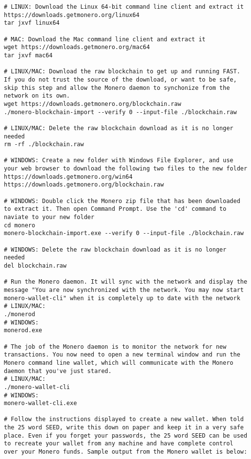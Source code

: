 \begin{lstlisting}
# LINUX: Download the Linux 64-bit command line client and extract it
https://downloads.getmonero.org/linux64
tar jxvf linux64

# MAC: Download the Mac command line client and extract it
wget https://downloads.getmonero.org/mac64
tar jxvf mac64

# LINUX/MAC: Download the raw blockchain to get up and running FAST. If you do not trust the source of the download, or want to be safe, skip this step and allow the Monero daemon to synchonize from the network on its own. 
wget https://downloads.getmonero.org/blockchain.raw
./monero-blockchain-import --verify 0 --input-file ./blockchain.raw

# LINUX/MAC: Delete the raw blockchain download as it is no longer needed 
rm -rf ./blockchain.raw

# WINDOWS: Create a new folder with Windows File Explorer, and use your web browser to download the following two files to the new folder
https://downloads.getmonero.org/win64
https://downloads.getmonero.org/blockchain.raw

# WINDOWS: Double click the Monero zip file that has been downloaded to extract it. Then open Command Prompt. Use the 'cd' command to naviate to your new folder
cd monero
monero-blockchain-import.exe --verify 0 --input-file ./blockchain.raw

# WINDOWS: Delete the raw blockchain download as it is no longer needed
del blockchain.raw

# Run the Monero daemon. It will sync with the network and display the message "You are now synchronized with the network. You may now start monero-wallet-cli" when it is completely up to date with the network
# LINUX/MAC:
./monerod
# WINDOWS:
monerod.exe

# The job of the Monero daemon is to monitor the network for new transactions. You now need to open a new terminal window and run the Monero command line wallet, which will communicate with the Monero daemon that you've just stared.
# LINUX/MAC:
./monero-wallet-cli
# WINDOWS:
monero-wallet-cli.exe

# Follow the instructions displayed to create a new wallet. When told the 25 word SEED, write this down on paper and keep it in a very safe place. Even if you forget your passwords, the 25 word SEED can be used to recreate your wallet from any machine and have complete control over your Monero funds. Sample output from the Monero wallet is below:


\end{lstlisting}
